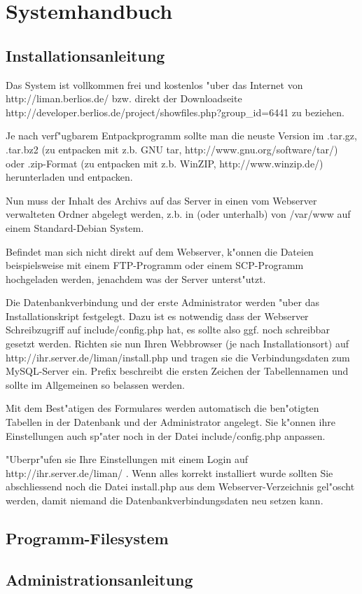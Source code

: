 \chapter{Systemhandbuch}
\section{Installationsanleitung}
Das System ist vollkommen frei und kostenlos "uber das Internet von http://liman.berlios.de/ 
bzw. direkt der 
Downloadseite http://developer.berlios.de/project/showfiles.php?group\_id=6441 
zu beziehen.

Je nach verf"ugbarem Entpackprogramm sollte man die neuste Version im .tar.gz, 
.tar.bz2 (zu entpacken mit z.b. GNU tar, http://www.gnu.org/software/tar/) oder .zip-Format 
(zu entpacken mit z.b. WinZIP, http://www.winzip.de/) herunterladen und entpacken.

Nun muss der Inhalt des Archivs auf das Server in einen vom Webserver verwalteten Ordner 
abgelegt werden, z.b. in (oder unterhalb) von /var/www auf einem Standard-Debian System.

Befindet man sich nicht direkt auf dem Webserver, k"onnen die Dateien beispielsweise mit 
einem FTP-Programm oder einem SCP-Programm hochgeladen werden, jenachdem was der Server 
unterst"utzt.

Die Datenbankverbindung und der erste Administrator werden "uber das Installationskript 
festgelegt. Dazu ist es notwendig dass der Webserver Schreibzugriff auf include/config.php
hat, es sollte also ggf. noch schreibbar gesetzt werden. Richten sie nun Ihren Webbrowser 
(je nach Installationsort) auf http://ihr.server.de/liman/install.php und tragen sie die 
Verbindungsdaten zum MySQL-Server ein.
Prefix beschreibt die ersten Zeichen der Tabellennamen und sollte im Allgemeinen so belassen
werden.

Mit dem Best"atigen des Formulares werden automatisch die ben"otigten Tabellen in der Datenbank 
und der Administrator angelegt. Sie k"onnen ihre Einstellungen auch sp"ater noch in der Datei
include/config.php anpassen.

"Uberpr"ufen sie Ihre Einstellungen mit einem Login auf http://ihr.server.de/liman/ .
Wenn alles korrekt installiert wurde sollten Sie abschliessend noch die Datei install.php 
aus dem Webserver-Verzeichnis gel"oscht werden, damit niemand die Datenbankverbindungsdaten neu 
setzen kann.

\section{Programm-Filesystem}

\section{Administrationsanleitung}
